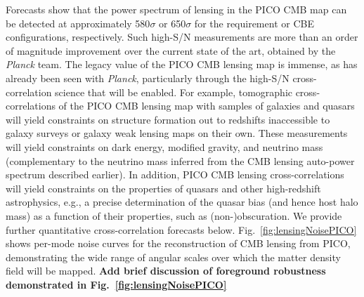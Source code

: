 \documentclass[PICOReport.tex]{subfiles}
\begin{document}
Forecasts show that the power spectrum of lensing in the PICO CMB map can be detected at approximately 580$\sigma$ or 650$\sigma$ for the requirement or CBE configurations, respectively.  Such high-S/N measurements are more than an order of magnitude improvement over the current state of the art, obtained by the {\it Planck} team.  The legacy value of the PICO CMB lensing map is immense, as has already been seen with {\it Planck}, particularly through the high-S/N cross-correlation science that will be enabled.  For example, tomographic cross-correlations of the PICO CMB lensing map with samples of galaxies and quasars will yield constraints on structure formation out to redshifts inaccessible to galaxy surveys or galaxy weak lensing maps on their own.  These measurements will yield constraints on dark energy, modified gravity, and neutrino mass (complementary to the neutrino mass inferred from the CMB lensing auto-power spectrum described earlier).  In addition, PICO CMB lensing cross-correlations will yield constraints on the properties of quasars and other high-redshift astrophysics, e.g., a precise determination of the quasar bias (and hence host halo mass) as a function of their properties, such as (non-)obscuration.  We provide further quantitative cross-correlation forecasts below.  Fig.~\ref{fig:lensingNoisePICO} shows per-mode noise curves for the reconstruction of CMB lensing from PICO, demonstrating the wide range of angular scales over which the matter density field will be mapped.  \textbf{Add brief discussion of foreground robustness demonstrated in Fig.~\ref{fig:lensingNoisePICO}}
\end{document}
